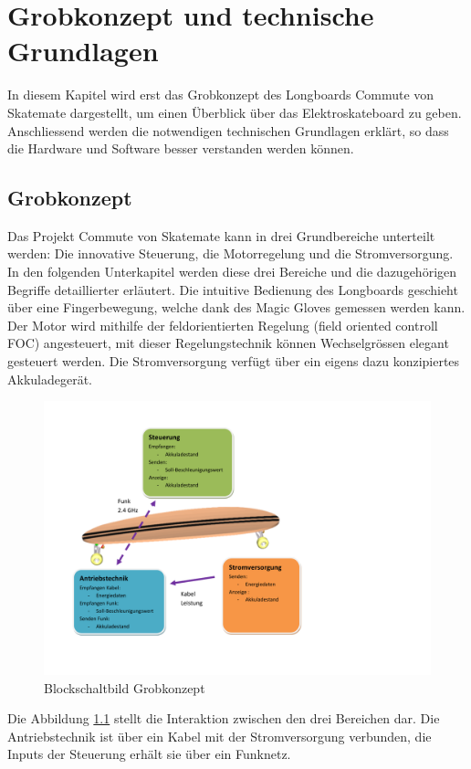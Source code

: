 \chapter{Grobkonzept und technische Grundlagen}
\label{TechnischeGrundlagen}
In diesem Kapitel wird erst das Grobkonzept des Longboards Commute von Skatemate dargestellt, um einen Überblick über das Elektroskateboard zu geben.
Anschliessend werden die notwendigen technischen Grundlagen erklärt, so dass die Hardware und Software besser verstanden werden können.


\section{Grobkonzept}
\label{Grobkonzept}
Das Projekt Commute von Skatemate kann in drei Grundbereiche unterteilt werden: Die innovative Steuerung, die Motorregelung und die Stromversorgung. \\
In den folgenden Unterkapitel werden diese drei Bereiche und die dazugehörigen Begriffe detaillierter erläutert. Die intuitive Bedienung des Longboards geschieht über eine Fingerbewegung, welche dank des Magic Gloves gemessen werden kann. Der Motor wird mithilfe der feldorientierten Regelung (field oriented controll FOC) angesteuert, mit dieser Regelungstechnik können Wechselgrössen elegant gesteuert werden. Die Stromversorgung verfügt über ein eigens dazu konzipiertes Akkuladegerät. 
\begin{figure}[H]
	\centering
	\includegraphics[width=0.8\linewidth, keepaspectratio]{images/Grobkonzept_Blockschaltbild_grob}
	\caption[Blockschaltbild Grobkonzept]{Blockschaltbild Grobkonzept}
	\label{fig:grobkonzeptblockschaltbildgrob}
\end{figure}
Die Abbildung \ref{fig:grobkonzeptblockschaltbildgrob} stellt die Interaktion zwischen den drei Bereichen dar. Die Antriebstechnik ist über ein Kabel mit der Stromversorgung verbunden, die Inputs der Steuerung erhält sie über ein Funknetz. \\
